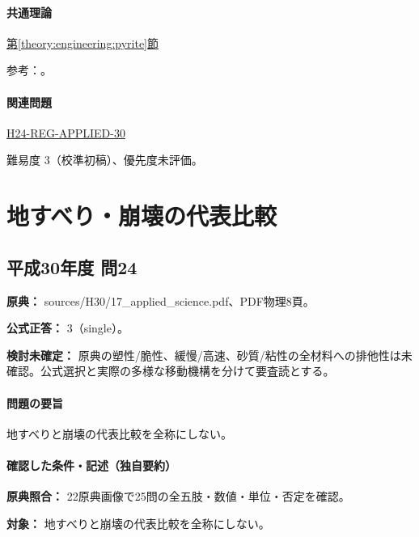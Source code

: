 \paragraph{共通理論} \hyperref[theory:engineering:pyrite]{第\ref*{theory:engineering:pyrite}節}

\par 参考：\cite{eng52_weathering,eng52_slip_weaklayer}。

\paragraph{関連問題} \hyperref[q:h24-reg-applied-30]{H24-REG-APPLIED-30}

\par 難易度 3（校準初稿）、優先度未評価。

\section{地すべり・崩壊の代表比較}

\subsection{平成30年度 問24}
\label{q:h30-reg-applied-24}

\noindent\textbf{原典：} sources/H30/17\_applied\_science.pdf、PDF物理8頁。

\textbf{公式正答：} 3（single）。

\par\textbf{検討未確定：} 原典の塑性/脆性、緩慢/高速、砂質/粘性の全材料への排他性は未確認。公式選択と実際の多様な移動機構を分けて要査読とする。

\paragraph{問題の要旨} 地すべりと崩壊の代表比較を全称にしない。

\paragraph{確認した条件・記述（独自要約）}\mbox{}\par

\noindent\textbf{原典照合：} 22原典画像で25問の全五肢・数値・単位・否定を確認。\par

\noindent\textbf{対象：} 地すべりと崩壊の代表比較を全称にしない。\par

